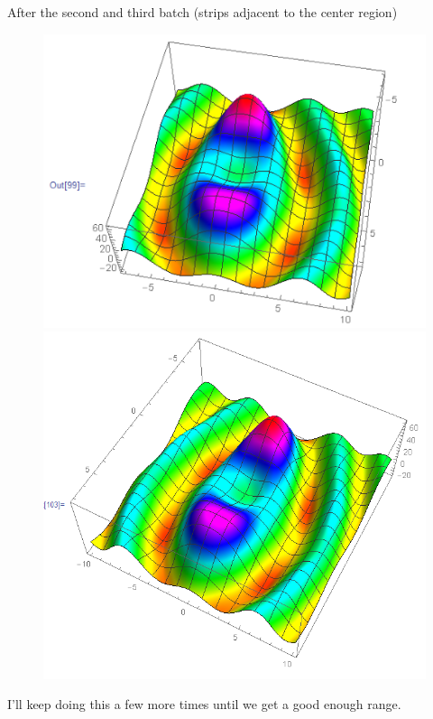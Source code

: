 \documentclass{article}
\theoremstyle{definition}
\begin{document}
After the second and third batch (strips adjacent to the center region)
\begin{figure}[!htb]
	\centering
	\includegraphics[scale=0.3]{conv-7}
	\includegraphics[scale=0.4]{conv-8}
\end{figure}





I'll keep doing this a few more times until we get a good enough range.\\
\end{document}
